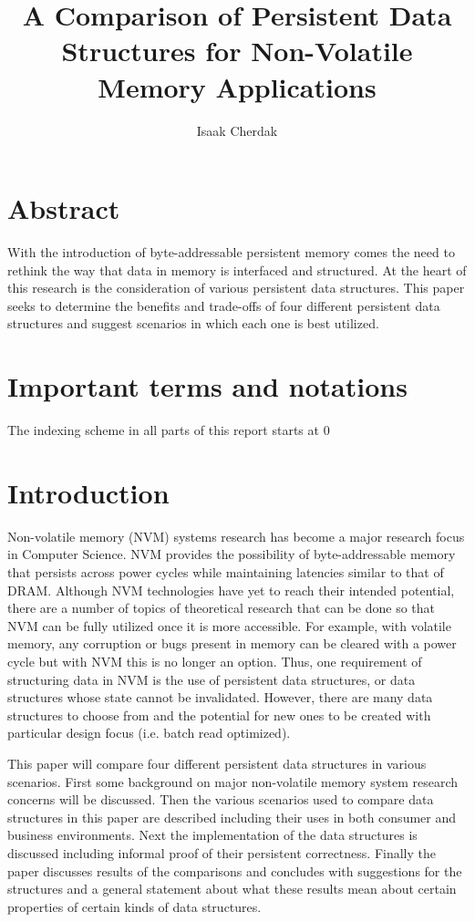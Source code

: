 \documentclass[twocolumn]{article}
\title{A Comparison of Persistent Data Structures for Non-Volatile Memory
Applications}
\author{Isaak Cherdak}
\begin{document}
\maketitle

\section*{Abstract}

With the introduction of byte-addressable persistent memory comes the need to
rethink the way that data in memory is interfaced and structured. At the heart
of this research is the consideration of various persistent data structures.
This paper seeks to determine the benefits and trade-offs of four different
persistent data structures and suggest scenarios in which each one is best
utilized.

\pagebreak

\section*{Important terms and notations}


The indexing scheme in all parts of this report starts at 0


\section{Introduction}

Non-volatile memory (NVM) systems research has become a major research focus in
Computer Science. NVM provides the possibility of byte-addressable memory that
persists across power cycles while maintaining latencies similar to that of
DRAM. Although NVM technologies have yet to reach their intended potential,
there are a number of topics of theoretical research that can be done so that
NVM can be fully utilized once it is more accessible. For example, with volatile
memory, any corruption or bugs present in memory can be cleared with a power
cycle but with NVM this is no longer an option. Thus, one requirement of
structuring data in NVM is the use of persistent data structures, or data
structures whose state cannot be invalidated. However, there are many data
structures to choose from and the potential for new ones to be created with
particular design focus (i.e. batch read optimized).

This paper will compare four different persistent data structures in various
scenarios. First some background on major non-volatile memory system research
concerns will be discussed. Then the various scenarios used to compare data
structures in this paper are described including their uses in both consumer and
business environments. Next the implementation of the data structures is
discussed including informal proof of their persistent correctness. Finally the
paper discusses results of the comparisons and concludes with suggestions for
the structures and a general statement about what these results mean about
certain properties of certain kinds of data structures.
\end{document}
